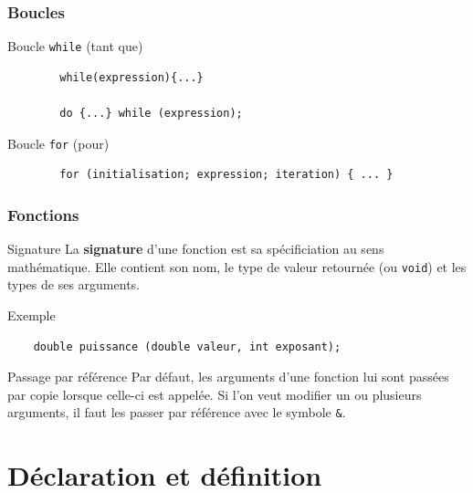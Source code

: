 \begin{frame}[fragile]
	\frametitle{Boucles}
	\begin{block}{Boucle \texttt{while} (tant que)}
		\begin{verbatim}
		while(expression){...}

		do {...} while (expression);
        \end{verbatim}
	\end{block}
    
	\begin{block}{Boucle \texttt{for} (pour)}
		\begin{verbatim}
        for (initialisation; expression; iteration) { ... }
        \end{verbatim}
	\end{block}
\end{frame}


\begin{frame}[fragile]
	\frametitle{Fonctions}
    \begin{block}{Signature}
    La \textbf{signature} d'une fonction est sa spécificiation au sens mathématique. Elle contient son nom, le type de valeur retournée (ou \texttt{void}) et les types de ses arguments.
    \end{block}
    
    \begin{exampleblock}{Exemple}
    \begin{verbatim}
    double puissance (double valeur, int exposant);
    \end{verbatim}
    \end{exampleblock}
    
    \begin{alertblock}{Passage par référence}
    Par défaut, les arguments d'une fonction lui sont passées par copie lorsque celle-ci est appelée. Si l'on veut modifier un ou plusieurs arguments, il faut les passer par référence avec le symbole \texttt{\&}.
    \end{alertblock}
\end{frame}

\section{Déclaration et définition}

